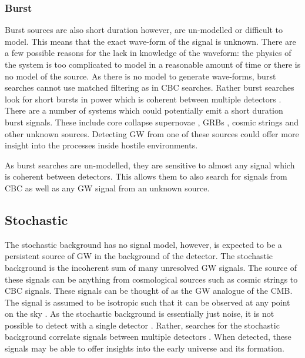\subsubsection{\label{sources:transient:burst}Burst}

Burst sources are also short duration however, are un-modelled or difficult to model.
This means that the exact wave-form of the signal is unknown.
There are a few possible reasons for the lack in knowledge of the waveform: the physics of the system is too complicated to model in a reasonable amount of time or there is no model of the source.
As there is no model to generate wave-forms, burst searches cannot use matched filtering as in \ac{CBC} searches.
Rather burst searches look for short bursts in power which is coherent between multiple detectors \citep{cornish2015BayeswaveBayesian, klimenko2008CoherentMethod}.
There are a number of systems which could potentially emit a short duration burst signals.
These include core collapse supernovae \citep{ott2008GravitationalWave}, \acp{GRB} \citep{aasi2014SearchGravitational}, cosmic strings \citep{damour2005GravitationalRadiation} and other unknown sources.
Detecting \ac{GW} from one of these sources could offer more insight into the processes inside hostile environments.

As burst searches are un-modelled, they are sensitive to almost any signal which is coherent between detectors. 
This allows them to also search for signals from \ac{CBC} as well as any \ac{GW} signal from an unknown source.



\subsection{Stochastic}

The stochastic background has no signal model, however, is expected to be a persistent source of \ac{GW} in the background of the detector. 
The stochastic background is the incoherent sum of many unresolved \ac{GW} signals.
The source of these signals can be anything from cosmological sources such as cosmic strings to \ac{CBC} signals.
These signals can be thought of as the \ac{GW} analogue of the \ac{CMB}.
The signal is assumed to be isotropic such that it can be observed at any point on the sky \citep{christensen2018StochasticGravitational}. 
As the stochastic background is essentially just noise, it is not possible to detect with a single detector \citep{christensen2018StochasticGravitational}.
Rather, searches for the stochastic background correlate signals between multiple detectors \citep{romano2019SearchesStochastic,christensen2018StochasticGravitational}. 
When detected, these signals may be able to offer insights into the early universe and its formation.



